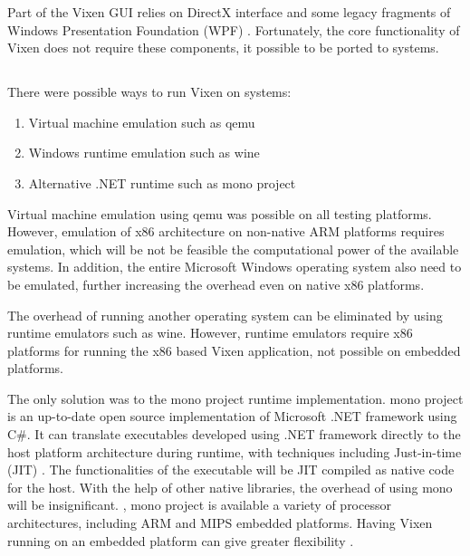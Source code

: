 Part of the Vixen GUI relies on  DirectX interface \cite{directx} and some legacy fragments of Windows Presentation Foundation (WPF) \cite{wpf}. Fortunately, the core functionality of Vixen does not require these components,  it possible to be ported to  systems.

\subsection{}

There were  possible ways to run Vixen on  systems:

\begin{enumerate}[noitemsep]
  \item Virtual machine emulation such as qemu \cite{qemu}
  \item Windows runtime emulation such as wine \cite{wine}
  \item Alternative .NET runtime  such as  mono project \cite{de2004mono}
\end{enumerate}

Virtual machine emulation using qemu was possible on all testing platforms. However, emulation of x86 architecture on non-native ARM platforms requires  emulation, which will be not be feasible  the computational power of the available systems. In addition, the entire Microsoft Windows operating system  also need to be emulated, further increasing the overhead even on native x86 platforms.

The overhead of running another operating system can be eliminated by using runtime emulators such as wine. However, runtime emulators require x86 platforms for running the x86 based Vixen application,  not possible on  embedded platforms.

The only  solution was to  the mono project runtime implementation.  mono project is an up-to-date open source implementation of Microsoft .NET framework using C\#. It can translate executables developed using .NET framework directly to the host platform architecture during runtime, with techniques including Just-in-time (JIT) . The functionalities of the executable will be JIT compiled as native code for the host. With the help of other native libraries, the overhead of using  mono  will be insignificant. ,  mono project is available  a variety of processor architectures, including ARM and MIPS embedded platforms. Having Vixen running on an embedded platform can give greater flexibility .

